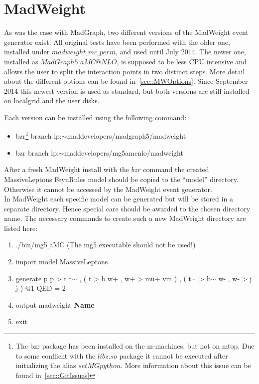 \section{MadWeight}

As was the case with MadGraph, two different versions of the MadWeight event generator exist. All original tests have been performed with the older one, installed under $madweight\_mc\_perm$, and used until July 2014. The newer one, installed as $MadGraph5\_aMC@NLO$, is supposed to be less CPU intensive and allows the user to split the interaction points in two distinct steps. More detail about the different options can be found in~\ref{sec::MWOptions}.
Since September 2014 this newest version is used as standard, but both versions are still installed on localgrid and the user disks.

Each version can be installed using the following command:
\begin{itemize}
  \item bzr\footnote{The bzr package has been installed on the m-machines, but not on mtop. Due to some conflicht with the $libz.so$ package it cannot be executed after initializing the alias $setMGpython$. More information about this issue can be found in~\ref{sec::GitIssues}} branch lp:$\sim$maddevelopers/madgraph5/madweight 
  \item bzr branch lp:$\sim$maddevelopers/mg5amcnlo/madweight
\end{itemize}

After a fresh MadWeight install with the $bzr$ command the created MassiveLeptons FeynRules model should be copied to the ``model'' directory. Otherwise it cannot be accessed by the MadWeight event generator.\\
In MadWeight each specific model can be generated but will be stored in a separate directory. Hence special care should be awarded to the chosen directory name. The necessary commands to create such a new MadWeight directory are listed here:
  \begin{enumerate}
    \item ./bin/mg5$\_$aMC (The mg5 executable should not be used!)
    \item import model MassiveLeptons
    \item generate p p > t t$\sim$ , ( t > b w+ , w+ > mu+ vm ) , ( t$\sim$ > b$\sim$ w- , w- > j j ) @1 QED = 2 
    \item output madweight \textbf{Name}
    \item exit
  \end{enumerate}
  
